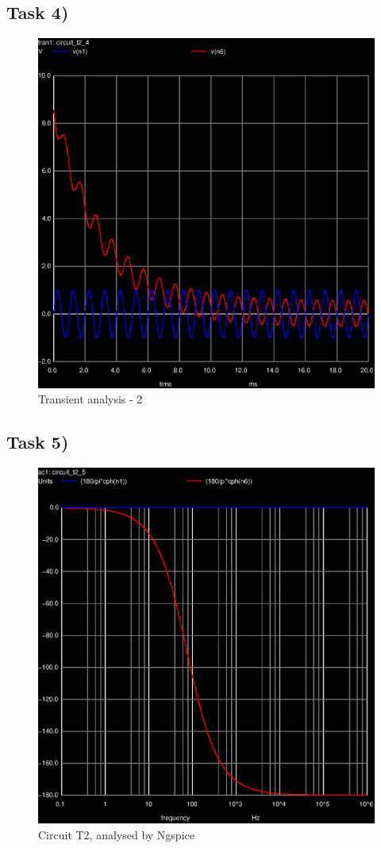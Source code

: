 \subsection{Task 4)}
\label{subsec:task4}


\begin{figure}[ht]
	\centering
	\includegraphics[width=0.55\linewidth]{trans-2.eps}
	\caption{Transient analysis - 2}
\label{fig:trans-2}
\end{figure}


\subsection{Task 5)}
\label{subsec:task5}


\begin{figure}[ht]
	\centering
	\includegraphics[width=0.55\linewidth]{ac-2.eps}
	\caption{Circuit T2, analysed by Ngspice}
\label{fig:Dsnh_sim_t2}
\end{figure}

